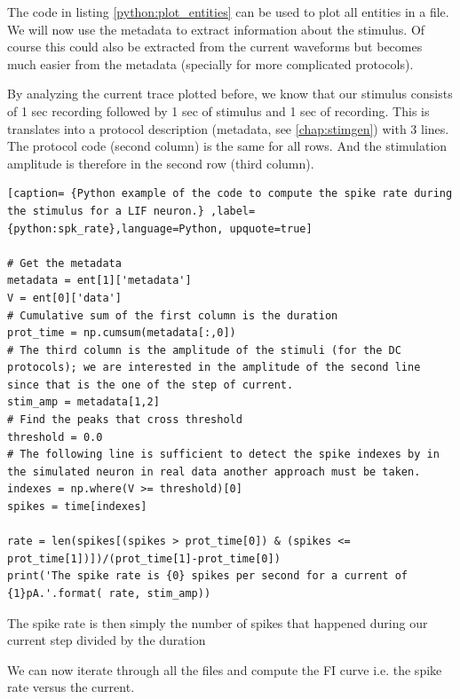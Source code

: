 The code in listing \ref{python:plot_entities} can be used to plot all entities in a file. We will now use the metadata to extract information about the stimulus. Of course this could also be extracted from the current waveforms but becomes much easier from the metadata (specially for more complicated protocols).

By analyzing the current trace plotted before, we know that our stimulus consists of 1 sec recording followed by 1 sec of stimulus and 1 sec of recording. This is translates into a  protocol description (metadata, see \ref{chap:stimgen}) with 3 lines. The protocol code (second column) is the same for all rows. And the stimulation amplitude is therefore in the second row (third column). 

\renewcommand{\lstlistingname}{Example}
\begin{lstlisting}[caption= {Python example of the code to compute the spike rate during the stimulus for a LIF neuron.} ,label={python:spk_rate},language=Python, upquote=true]

# Get the metadata
metadata = ent[1]['metadata']
V = ent[0]['data']
# Cumulative sum of the first column is the duration 
prot_time = np.cumsum(metadata[:,0])
# The third column is the amplitude of the stimuli (for the DC protocols); we are interested in the amplitude of the second line since that is the one of the step of current.
stim_amp = metadata[1,2]
# Find the peaks that cross threshold
threshold = 0.0
# The following line is sufficient to detect the spike indexes by in the simulated neuron in real data another approach must be taken.
indexes = np.where(V >= threshold)[0]
spikes = time[indexes]

rate = len(spikes[(spikes > prot_time[0]) & (spikes <= prot_time[1])])/(prot_time[1]-prot_time[0])
print('The spike rate is {0} spikes per second for a current of {1}pA.'.format( rate, stim_amp))
\end{lstlisting}

The spike rate is then simply the number of spikes that happened during our current step divided by the duration

We can now iterate through all the files and compute the FI curve i.e. the spike rate versus the current.

